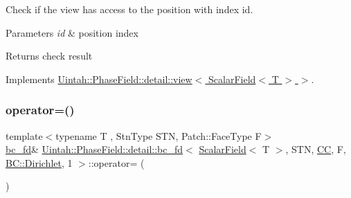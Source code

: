 Check if the view has access to the position with index id. 


\begin{DoxyParams}{Parameters}
{\em id} & position index \\
\hline
\end{DoxyParams}
\begin{DoxyReturn}{Returns}
check result 
\end{DoxyReturn}


Implements \hyperlink{classUintah_1_1PhaseField_1_1detail_1_1view_3_01ScalarField_3_01T_01_4_01_4_a9a950513dacd6468658436b737c3314f}{Uintah\+::\+Phase\+Field\+::detail\+::view$<$ Scalar\+Field$<$ T $>$ $>$}.

\mbox{\label{classUintah_1_1PhaseField_1_1detail_1_1bc__fd_3_01ScalarField_3_01T_01_4_00_01STN_00_01CC_00_01Fa77b2fd7fb77d0a4dc6c86c68d4ea0bc_abd92f471dd7440b6a1c2ea3a7b977807}} 
\subsubsection{\texorpdfstring{operator=()}{operator=()}}
{\footnotesize\ttfamily template$<$typename T , Stn\+Type S\+TN, Patch\+::\+Face\+Type F$>$ \\
\hyperlink{classUintah_1_1PhaseField_1_1detail_1_1bc__fd}{bc\+\_\+fd}\& \hyperlink{classUintah_1_1PhaseField_1_1detail_1_1bc__fd}{Uintah\+::\+Phase\+Field\+::detail\+::bc\+\_\+fd}$<$ \hyperlink{structUintah_1_1PhaseField_1_1ScalarField}{Scalar\+Field}$<$ T $>$, S\+TN, \hyperlink{namespaceUintah_1_1PhaseField_a33d355affda78a83f45755ba8388cedda22303704507d024d1d6508ed9859a85a}{CC}, F, \hyperlink{namespaceUintah_1_1PhaseField_a148fba372aa3be96fd6eede7a2fa10b5abac152b762896edff34ed668ae1a546f}{B\+C\+::\+Dirichlet}, 1 $>$\+::operator= (\begin{DoxyParamCaption}\item[{const \hyperlink{classUintah_1_1PhaseField_1_1detail_1_1bc__fd}{bc\+\_\+fd}$<$ \hyperlink{structUintah_1_1PhaseField_1_1ScalarField}{Scalar\+Field}$<$ T $>$, S\+TN, \hyperlink{namespaceUintah_1_1PhaseField_a33d355affda78a83f45755ba8388cedda22303704507d024d1d6508ed9859a85a}{CC}, F, \hyperlink{namespaceUintah_1_1PhaseField_a148fba372aa3be96fd6eede7a2fa10b5abac152b762896edff34ed668ae1a546f}{B\+C\+::\+Dirichlet}, 1 $>$ \&}]{ }\end{DoxyParamCaption})\hspace{0.3cm}{\ttfamily [delete]}}



